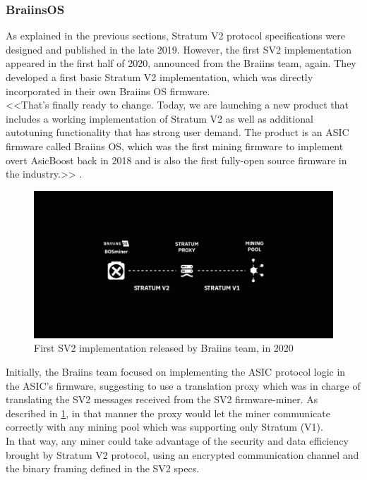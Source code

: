 \subsubsection{\textbf{BraiinsOS}}
As explained in the previous sections, Stratum V2 protocol specifications were designed and published in the late 2019. However, the first SV2 implementation appeared in the first half of 2020, announced from the Braiins team, again. They developed a first basic Stratum V2 implementation, which was directly incorporated in their own Braiins OS firmware.\\
<<That's finally ready to change. Today, we are launching a new product that includes a working implementation of Stratum V2 as well as additional autotuning functionality that has strong user demand. The product is an ASIC firmware called Braiins OS, which was the first mining firmware to implement overt AsicBoost back in 2018 and is also the first fully-open source firmware in the industry.>> \cite{braiinsDrivingStratum}.

\begin{figure}[h!]
    \centering
    \includegraphics[width=15cm]{Figures/sv2/sv2_7.png}
    \caption{First SV2 implementation released by Braiins team, in 2020}
    \label{fig:sv2_7}
\end{figure}
\noindent Initially, the Braiins team focused on implementing the ASIC protocol logic in the ASIC's firmware, suggesting to use a translation proxy which was in charge of translating the SV2 messages received from the SV2 firmware-miner. As described in \ref{fig:sv2_7}, in that manner the proxy would let the miner communicate correctly with any mining pool which was supporting only Stratum (V1).\\
In that way, any miner could take advantage of the security and data efficiency brought by Stratum V2 protocol, using an encrypted communication channel and the binary framing defined in the SV2 specs.\\

